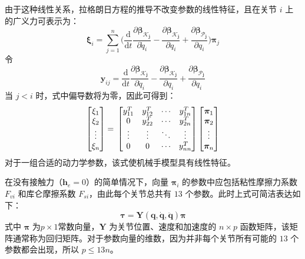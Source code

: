\documentclass[cn,11pt,chinese,blue,bibstyle=ieeetr]{elegantbook}
\begin{document}
由于这种线性关系，拉格朗日方程的推导不改变参数的线性特征，且在关节 $i$ 上的广义力可表示为：
\begin{equation}\label{augmented_link_lagrange_equation}
\bm{\xi}_i = \sum_{j=1}^{n} \Big(\frac{\mathrm{d}}{\mathrm{d}t} \frac{\partial \bm{\beta_{\mathcal{K}_j}}}{\partial \dot{q}_i} - \frac{\partial \bm{\beta_{\mathcal{K}_j}}}{\partial q_i} + \frac{\partial \bm{\beta_{\mathcal{P}_j}}}{\partial q_i}
\Big) \bm{\pi}_j
\end{equation}
令
\begin{equation}
\bm{y}_{ij} = \frac{\mathrm{d}}{\mathrm{d}t} \frac{\partial \bm{\beta_{\mathcal{K}_j}}}{\partial \dot{q}_i} - \frac{\partial \bm{\beta_{\mathcal{K}_j}}}{\partial q_i} + \frac{\partial \bm{\beta_{\mathcal{P}_j}}}{\partial q_i} \nonumber
\end{equation}
当 $j < i$ 时，式中偏导数将为零，因此可得到：
\begin{equation}
\begin{bmatrix}
\xi_1  \\
\xi_2  \\
\vdots \\
\xi_n
\end{bmatrix} = \\
\begin{bmatrix}
y_{11}^T & y_{12}^T & \cdots & y_{1n}^T \\
0        & y_{22}^T & \cdots & y_{2n}^T \\
\vdots   & \vdots   & \ddots & \vdots \\
0        & 0        & \cdots & y_{nn}^T \\
\end{bmatrix}
\begin{bmatrix}
\bm{\pi}_1 \\
\bm{\pi}_2 \\
\vdots \\
\bm{\pi}_n
\end{bmatrix} \nonumber
\end{equation}
对于一组合适的动力学参数，该式使机械手模型具有线性特征。

在没有接触力（$\bm{h}_e = 0$）的简单情况下，向量 $\bm{\pi}_i$ 的参数中应包括粘性摩擦力系数 $F_{vi}$ 和库仑摩擦系数 $F_{si}$，由此每个关节总共有 $13$ 个参数。此时上式可简洁表达如下：
\begin{equation}
\bm{\tau = Y\left(q,\dot{q},\ddot{q}\right)\pi}
\end{equation}
式中 $\bm{\pi}$ 为$p \times 1$常数向量，$\bm{Y}$ 为关节位置、速度和加速度的 $n \times p$ 函数矩阵，该矩阵通常称为回归矩阵。对于参数向量的维数，因为并非每个关节所有可能的 $13$ 个参数都会出现，所以 $p \leq 13n$。
\end{document}

